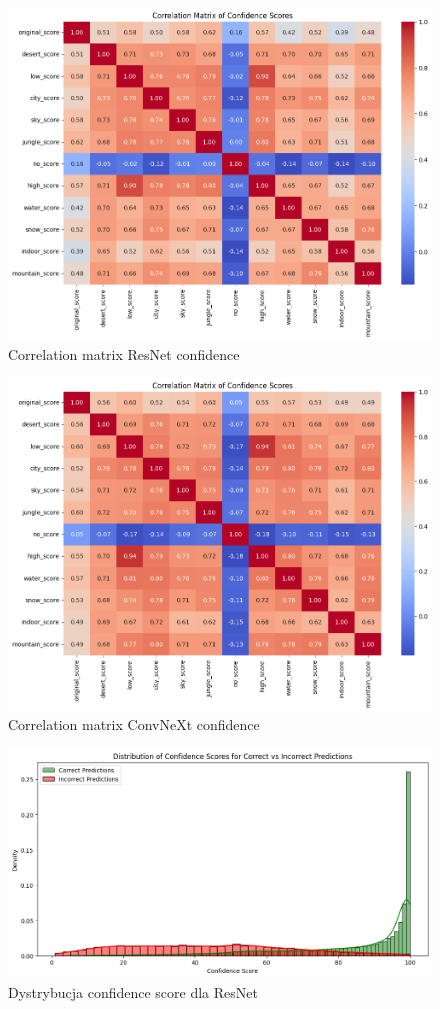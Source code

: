 \begin{figure}
	\centering\includegraphics[width=.9\textwidth]{img/correlation_matrix_res}
	\caption{Correlation matrix ResNet confidence}  
    \label{rys:correlation_resnet}
\end{figure}

\begin{figure}
	\centering\includegraphics[width=.9\textwidth]{img/correlation_matrix_conv}
	\caption{Correlation matrix ConvNeXt confidence}  
    \label{rys:correlation_convnext}
\end{figure}

\begin{figure}
	\centering\includegraphics[width=.9\textwidth]{img/resnet_conf_distro}
	\caption{Dystrybucja confidence score dla ResNet}
	\label{rys:res_c_distro}
\end{figure}

